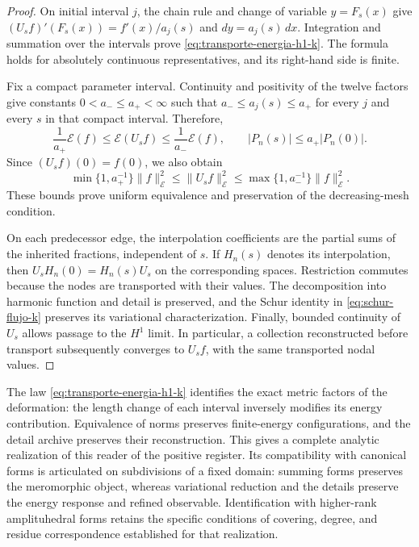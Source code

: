 \begin{proof}
On initial interval \(j\), the chain rule and change of variable
\(y=F_s(x)\) give \((U_sf)'(F_s(x))=f'(x)/a_j(s)\) and
\(dy=a_j(s)\,dx\). Integration and summation over the intervals
prove \eqref{eq:transporte-energia-h1-k}. The formula holds for
absolutely continuous representatives, and its right-hand side is finite.

Fix a compact parameter interval. Continuity and positivity of the
twelve factors give constants \(0<a_-\leq a_+<\infty\) such that
\(a_-\leq a_j(s)\leq a_+\) for every \(j\) and every \(s\)
in that compact interval. Therefore,
\[
 \frac1{a_+}\mathcal E(f)
 \leq\mathcal E(U_sf)
 \leq\frac1{a_-}\mathcal E(f),
 \qquad
 |P_n(s)|\leq a_+|P_n(0)|.
\]
Since \((U_sf)(0)=f(0)\), we also obtain
\[
 \min\{1,a_+^{-1}\}\|f\|_{\mathcal E}^2
 \leq\|U_sf\|_{\mathcal E}^2
 \leq\max\{1,a_-^{-1}\}\|f\|_{\mathcal E}^2.
\]
These bounds prove uniform equivalence and preservation of the
decreasing-mesh condition.

On each predecessor edge, the interpolation coefficients are the partial
sums of the inherited fractions, independent of \(s\).
If \(H_n(s)\) denotes its interpolation, then
\(U_sH_n(0)=H_n(s)U_s\) on the corresponding spaces.
Restriction commutes because the nodes are transported with their values.
The decomposition into harmonic function and detail is preserved,
and the Schur identity in \eqref{eq:schur-flujo-k} preserves its
variational characterization. Finally, bounded continuity of \(U_s\)
allows passage to the \(H^1\) limit. In particular, a collection
reconstructed before transport subsequently converges to \(U_sf\),
with the same transported nodal values.
\end{proof}

The law \eqref{eq:transporte-energia-h1-k} identifies the exact
metric factors of the deformation: the length change of each interval
inversely modifies its energy contribution. Equivalence of norms
preserves finite-energy configurations, and the detail archive preserves
their reconstruction. This gives a complete analytic realization of
this reader of the positive register. Its compatibility with canonical
forms is articulated on subdivisions of a fixed domain: summing forms
preserves the meromorphic object, whereas variational reduction and
the details preserve the energy response and refined observable.
Identification with higher-rank amplituhedral forms retains the
specific conditions of covering, degree, and residue correspondence
established for that realization.

